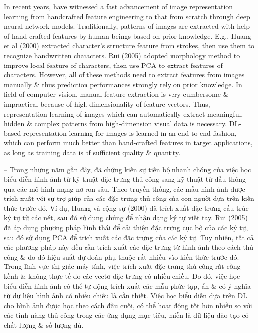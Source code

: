 \documentclass{article}
\begin{document}
\begin{itemize}
\begin{itemize}
\begin{itemize}
            In recent years, have witnessed a fast advancement of image representation learning from handcrafted feature engineering to that from scratch through deep neural network models. Traditionally, patterns of images are extracted with help of hand-crafted features by human beings based on prior knowledge. E.g., Huang et al (2000) extracted character's structure feature from strokes, then use them to recognize handwritten characters. Rui (2005) adopted morphology method to improve local feature of characters, then use PCA to extract features of characters. However, all of these methods need to extract features from images manually \& thus prediction performances strongly rely on prior knowledge. In field of computer vision, manual feature extraction is very cumbersome \& impractical because of high dimensionality of feature vectors. Thus, representation learning of images which can automatically extract meaningful, hidden \& complex patterns from high-dimension visual data is necessary. DL-based representation learning for images is learned in an end-to-end fashion, which can perform much better than hand-crafted features in target applications, as long as training data is of sufficient quality \& quantity.

            -- Trong những năm gần đây, đã chứng kiến sự tiến bộ nhanh chóng của việc học biểu diễn hình ảnh từ kỹ thuật đặc trưng thủ công sang kỹ thuật từ đầu thông qua các mô hình mạng nơ-ron sâu. Theo truyền thống, các mẫu hình ảnh được trích xuất với sự trợ giúp của các đặc trưng thủ công của con người dựa trên kiến thức trước đó. Ví dụ, Huang và cộng sự (2000) đã trích xuất đặc trưng cấu trúc ký tự từ các nét, sau đó sử dụng chúng để nhận dạng ký tự viết tay. Rui (2005) đã áp dụng phương pháp hình thái để cải thiện đặc trưng cục bộ của các ký tự, sau đó sử dụng PCA để trích xuất các đặc trưng của các ký tự. Tuy nhiên, tất cả các phương pháp này đều cần trích xuất các đặc trưng từ hình ảnh theo cách thủ công \& do đó hiệu suất dự đoán phụ thuộc rất nhiều vào kiến thức trước đó. Trong lĩnh vực thị giác máy tính, việc trích xuất đặc trưng thủ công rất cồng kềnh \& không thực tế do các vectơ đặc trưng có nhiều chiều. Do đó, việc học biểu diễn hình ảnh có thể tự động trích xuất các mẫu phức tạp, ẩn \& có ý nghĩa từ dữ liệu hình ảnh có nhiều chiều là cần thiết. Việc học biểu diễn dựa trên DL cho hình ảnh được học theo cách đầu cuối, có thể hoạt động tốt hơn nhiều so với các tính năng thủ công trong các ứng dụng mục tiêu, miễn là dữ liệu đào tạo có chất lượng \& số lượng đủ.


\end{itemize}
\end{itemize}
\end{itemize}
\end{document}
